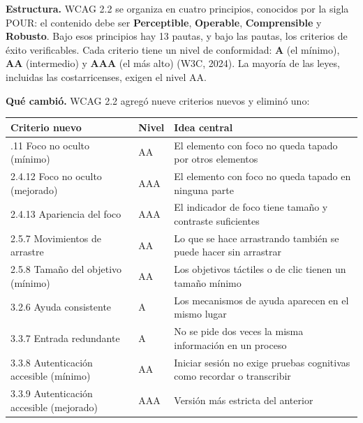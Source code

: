 \documentclass[10pt,letterpaper,onecolumn]{IEEEtran}
\newcommand{\filafina}{\arrayrulecolor{black!30}\specialrule{0.3pt}{1.5pt}{1.5pt}\arrayrulecolor{black}}
\begin{document}
\textbf{Estructura.} WCAG 2.2 se organiza en cuatro principios, conocidos por la sigla POUR: el contenido debe ser \textbf{Perceptible}, \textbf{Operable}, \textbf{Comprensible} y \textbf{Robusto}. Bajo esos principios hay 13 pautas, y bajo las pautas, los criterios de éxito verificables. Cada criterio tiene un nivel de conformidad: \textbf{A} (el mínimo), \textbf{AA} (intermedio) y \textbf{AAA} (el más alto) (W3C, 2024). La mayoría de las leyes, incluidas las costarricenses, exigen el nivel AA.

\textbf{Qué cambió.} WCAG 2.2 agregó nueve criterios nuevos y eliminó uno:

\begin{longtable}[]{@{}
  >{\raggedright\arraybackslash}p{0.3889\dimexpr\linewidth-4\tabcolsep\relax}
  >{\raggedright\arraybackslash}p{0.0972\dimexpr\linewidth-4\tabcolsep\relax}
  >{\raggedright\arraybackslash}p{0.5139\dimexpr\linewidth-4\tabcolsep\relax}@{}}
\toprule\noalign{}
\begin{minipage}[b]{\linewidth}\raggedright
Criterio nuevo
\end{minipage} & \begin{minipage}[b]{\linewidth}\raggedright
Nivel
\end{minipage} & \begin{minipage}[b]{\linewidth}\raggedright
Idea central
\end{minipage} \\
\midrule\noalign{}
\endhead
\bottomrule\noalign{}
\endlastfoot
2.4.11 Foco no oculto (mínimo) & AA & El elemento con foco no queda tapado por otros elementos \\ \filafina
2.4.12 Foco no oculto (mejorado) & AAA & El elemento con foco no queda tapado en ninguna parte \\ \filafina
2.4.13 Apariencia del foco & AAA & El indicador de foco tiene tamaño y contraste suficientes \\ \filafina
2.5.7 Movimientos de arrastre & AA & Lo que se hace arrastrando también se puede hacer sin arrastrar \\ \filafina
2.5.8 Tamaño del objetivo (mínimo) & AA & Los objetivos táctiles o de clic tienen un tamaño mínimo \\ \filafina
3.2.6 Ayuda consistente & A & Los mecanismos de ayuda aparecen en el mismo lugar \\ \filafina
3.3.7 Entrada redundante & A & No se pide dos veces la misma información en un proceso \\ \filafina
3.3.8 Autenticación accesible (mínimo) & AA & Iniciar sesión no exige pruebas cognitivas como recordar o transcribir \\ \filafina
3.3.9 Autenticación accesible (mejorado) & AAA & Versión más estricta del anterior \\
\end{longtable}
\end{document}
